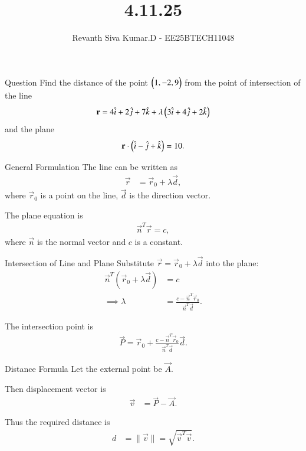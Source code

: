 \documentclass{beamer}
\title %
{4.11.25}
\author %
{Revanth Siva Kumar.D - EE25BTECH11048}
\begin{document}
	
	\frame{\titlepage}
	
	\begin{frame}{Question}
		Find the distance of the point $\begin{pmatrix}1,-2,9\end{pmatrix}$ from the point of intersection of the line
		\[
		\mathbf{r} = 4\hat{i} + 2\hat{j} + 7\hat{k} + \lambda \begin{pmatrix}3\hat{i} + 4\hat{j} + 2\hat{k}\end{pmatrix}
		\]
		and the plane
		\[
		\mathbf{r}\cdot\begin{pmatrix}\hat{i} - \hat{j} + \hat{k}\end{pmatrix} = 10.
		\]
	\end{frame}
	
	
	\begin{frame}{General Formulation}
	The line can be written as
	\begin{align}
	    \vec{r} &= \vec{r}_0 + \lambda \vec{d},
	\end{align}
	where $\vec{r}_0$ is a point on the line, $\vec{d}$ is the direction vector.
	
	The plane equation is
	\begin{align}
	    \vec{n}^T \vec{r} = c,
	\end{align}
	where $\vec{n}$ is the normal vector and $c$ is a constant.
	\end{frame}
	
	
	\begin{frame}{Intersection of Line and Plane}
	Substitute $\vec{r} = \vec{r}_0 + \lambda \vec{d}$ into the plane:
	\begin{align}
	    \vec{n}^T(\vec{r}_0 + \lambda \vec{d}) &= c \\
	    \implies \lambda &= \frac{c - \vec{n}^T \vec{r}_0}{\vec{n}^T \vec{d}}.
	\end{align}
	
	The intersection point is
	\begin{align}
	    \vec{P} = \vec{r}_0 + \frac{c - \vec{n}^T \vec{r}_0}{\vec{n}^T \vec{d}} \vec{d}.
	\end{align}
	\end{frame}
	
	
	\begin{frame}{Distance Formula}
	Let the external point be $\vec{A}$.
	
	Then displacement vector is
	\begin{align}
	    \vec{v} &= \vec{P} - \vec{A}.
	\end{align}
	
	Thus the required distance is
	\begin{align}
	    d &= \|\vec{v}\| = \sqrt{\vec{v}^T \vec{v}}.
	\end{align}
	\end{frame}
	
\end{document}
